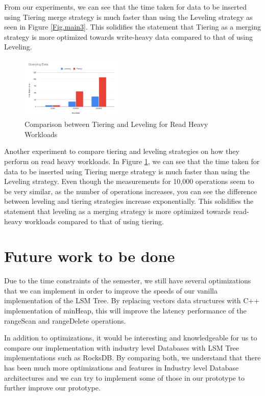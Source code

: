 \documentclass[sigconf]{acmart}
\begin{document}
    From our experiments, we can see that the time taken for data to be inserted using Tiering merge strategy is much faster than using the Leveling strategy as seen in Figure \ref{Fig.main3}. This solidifies the statement that Tiering as a merging strategy is more optimized towards write-heavy data compared to that of using Leveling.
    
    \begin{figure}[H]
        \centering
        \includegraphics[width=0.45\textwidth]{LatencyQuery.PNG}
        \caption{Comparison between Tiering and Leveling for Read Heavy Workloads}
        \label{Fig.main4}
    \end{figure}
    
    Another experiment to compare tiering and leveling strategies on how they perform on read heavy workloads. In Figure \ref{Fig.main4}, we can see that the time taken for data to be inserted using Tiering merge strategy is much faster than using the Leveling strategy. Even though the measurements for 10,000 operations seem to be very similar, as the number of operations increases, you can see the difference between leveling and tiering strategies increase exponentially. This solidifies the statement that leveling as a merging strategy is more optimized towards read-heavy workloads compared to that of using tiering.

    \section{Future work to be done}

   Due to the time constraints of the semester, we still have several optimizations that we can implement in order to improve the speeds of our vanilla implementation of the LSM Tree. By replacing vectors data structures with C++ implementation of minHeap, this will improve the latency performance of the rangeScan and rangeDelete operations. 
   
   In addition to optimizations, it would be interesting and knowledgeable for us to compare our implementation with industry level Databases with LSM Tree implementations such as RocksDB. By comparing both, we understand that there has been much more optimizations and features in Industry level Database architectures and we can try to implement some of those in our prototype to further improve our prototype.
\end{document}

